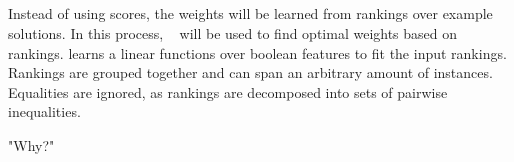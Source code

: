 \subsection{\svm}
Instead of using scores, the weights will be learned from rankings over example solutions.
In this process, \svm \  \cite{joachims2002optimizing} will be used to find optimal weights based on rankings.
\svm learns a linear functions over boolean features to fit the input rankings.
Rankings are grouped together and can span an arbitrary amount of instances.
Equalities are ignored, as rankings are decomposed into sets of pairwise inequalities.

"Why?"